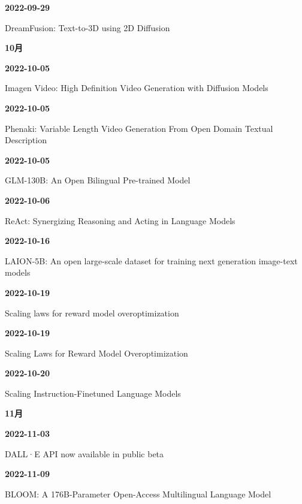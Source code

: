 \smallskip
\noindent\textbf{2022-09-29}\par
{\raggedright DreamFusion: Text-to-3D using 2D Diffusion\,\cite{src-b2dbb3098853}\par}
\smallskip
\medskip
\noindent\textbf{10月}\par
\smallskip
\noindent\textbf{2022-10-05}\par
{\raggedright Imagen Video: High Definition Video Generation with Diffusion Models\,\cite{chron-e2866e89df2e}\par}
\smallskip
\noindent\textbf{2022-10-05}\par
{\raggedright Phenaki: Variable Length Video Generation From Open Domain Textual Description\,\cite{chron-2cfa0a6d8a11}\par}
\smallskip
\noindent\textbf{2022-10-05}\par
{\raggedright GLM-130B: An Open Bilingual Pre-trained Model\,\cite{src-93a582f1513c}\par}
\smallskip
\noindent\textbf{2022-10-06}\par
{\raggedright ReAct: Synergizing Reasoning and Acting in Language Models\,\cite{src-811e1008822e}\par}
\smallskip
\noindent\textbf{2022-10-16}\par
{\raggedright LAION-5B: An open large-scale dataset for training next generation image-text models\,\cite{src-e0a494dc6724}\par}
\smallskip
\noindent\textbf{2022-10-19}\par
{\raggedright Scaling laws for reward model overoptimization\,\cite{src-1a032a768300}\par}
\smallskip
\noindent\textbf{2022-10-19}\par
{\raggedright Scaling Laws for Reward Model Overoptimization\,\cite{src-83ce66a102c3}\par}
\smallskip
\noindent\textbf{2022-10-20}\par
{\raggedright Scaling Instruction-Finetuned Language Models\,\cite{src-0c551201e765}\par}
\smallskip
\medskip
\noindent\textbf{11月}\par
\smallskip
\noindent\textbf{2022-11-03}\par
{\raggedright DALL·E API now available in public beta\,\cite{src-929080260e16}\par}
\smallskip
\noindent\textbf{2022-11-09}\par
{\raggedright BLOOM: A 176B-Parameter Open-Access Multilingual Language Model\,\cite{src-d6fb00ab1ec9}\par}
